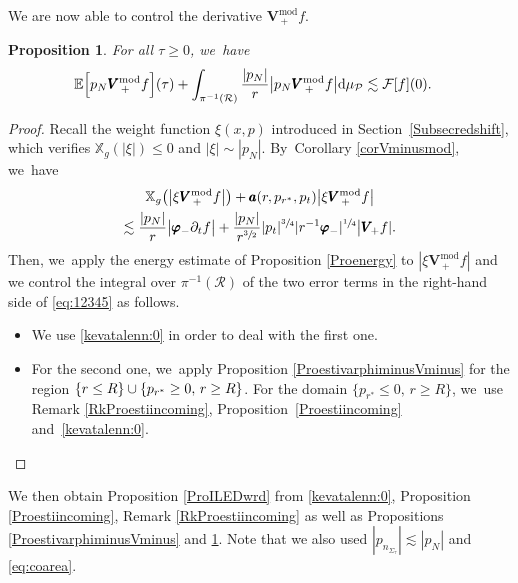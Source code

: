 \documentclass[JEP,XML,SOM,Unicode,published]{cedram}
\theoremstyle{plain}
\newtheorem{proposition}{Proposition}[section]
\theoremstyle{definition}
\newcommand\T{{\mathbb{X}}}
\newcommand\dr{{\mathrm{d}}}
\begin{document}
We are now able to control the derivative $\pmb{V}_{\, +}^{ \mathrm{mod}} f$.

\begin{proposition}\label{ProestiVminusmod}
For all $\tau \geq 0$, we~have
\begin{align*}
& \mathbb{E} \Bigl[ p_N \pmb{V}_{\, +}^{ \mathrm{mod}} f \Bigr](\tau)+ \int_{\pi^{-1}(\mathcal{R}) } \frac{|p_N|}{r} \big| p_N \pmb{V}_{\, +}^{ \mathrm{mod}} f \big| \dr \mu_{\mathcal{P}} \lesssim \mathcal{F}[f](0).
\end{align*}
\end{proposition}
\begin{proof}
Recall the weight function $\xi(x,p)$ introduced in Section~\ref{Subsecredshift}, which verifies $\T_g(|\xi|) \leq 0$ and $|\xi| \sim |p_N|$. By~Corollary \ref{corVminusmod}, we~have\vspace*{-5pt}
\begin{multline}\label{eq:12345}
\T_g \bigl(\big| \xi \pmb{V}_{\, +}^{ \mathrm{mod}} f \big| \bigr) + \pmb{a}(r,p_{r^*},p_t) \big| \xi \pmb{V}_{\, +}^{ \mathrm{mod}} f \big| \\
\lesssim \frac{|p_N|}{r } \big| \pmb{\varphi}_- \partial_t f \big|+\frac{|p_N|}{r^{\sfrac{3}{2}}} |p_t|^{\sfrac{3}{4}}| r^{-1} \pmb{\varphi}_- |^{\sfrac{1}{4}} \big| \pmb{V}_{\! +} f|.
\end{multline}
Then, we~apply the energy estimate of Proposition \ref{Proenergy} to $| \xi \pmb{V}_{\, +}^{ \mathrm{mod}} f |$ and we control the integral over $\pi^{-1}(\mathcal{R})$ of the two error terms in the right-hand side of \eqref{eq:12345} as follows.
\begin{itemize}
\item We use \eqref{kevatalenn:0} in order to deal with the first one.
\item For the second one, we~apply Proposition \ref{ProestivarphiminusVminus} for the region $\{ r \leq R \} \cup \{ p_{r^*} \geq\nobreak 0, \, r \geq\nobreak R \}$. For the domain $\{p_{r^*} \leq 0, \, r \geq R \}$, we~use Remark \ref{RkProestiincoming}, Proposition~\ref{Proestiincoming} and~\eqref{kevatalenn:0}.\qedhere
\end{itemize}
\end{proof}

We then obtain Proposition \ref{ProILEDwrd} from \eqref{kevatalenn:0}, Proposition \ref{Proestiincoming}, Remark \ref{RkProestiincoming} as well as Propositions \ref{ProestivarphiminusVminus} and \ref{ProestiVminusmod}. Note that we also used $|p_{n_{\Sigma_\tau}}| \lesssim |p_N|$ and \eqref{eq:coarea}.
\end{document}
